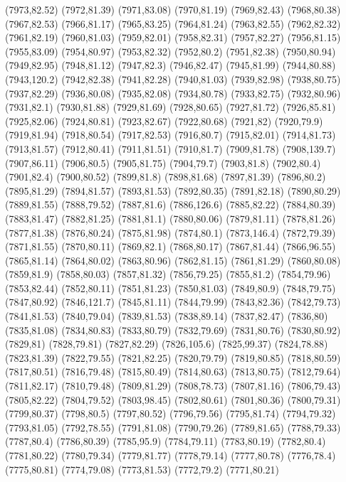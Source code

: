 (7973,82.52)
(7972,81.39)
(7971,83.08)
(7970,81.19)
(7969,82.43)
(7968,80.38)
(7967,82.53)
(7966,81.17)
(7965,83.25)
(7964,81.24)
(7963,82.55)
(7962,82.32)
(7961,82.19)
(7960,81.03)
(7959,82.01)
(7958,82.31)
(7957,82.27)
(7956,81.15)
(7955,83.09)
(7954,80.97)
(7953,82.32)
(7952,80.2)
(7951,82.38)
(7950,80.94)
(7949,82.95)
(7948,81.12)
(7947,82.3)
(7946,82.47)
(7945,81.99)
(7944,80.88)
(7943,120.2)
(7942,82.38)
(7941,82.28)
(7940,81.03)
(7939,82.98)
(7938,80.75)
(7937,82.29)
(7936,80.08)
(7935,82.08)
(7934,80.78)
(7933,82.75)
(7932,80.96)
(7931,82.1)
(7930,81.88)
(7929,81.69)
(7928,80.65)
(7927,81.72)
(7926,85.81)
(7925,82.06)
(7924,80.81)
(7923,82.67)
(7922,80.68)
(7921,82)
(7920,79.9)
(7919,81.94)
(7918,80.54)
(7917,82.53)
(7916,80.7)
(7915,82.01)
(7914,81.73)
(7913,81.57)
(7912,80.41)
(7911,81.51)
(7910,81.7)
(7909,81.78)
(7908,139.7)
(7907,86.11)
(7906,80.5)
(7905,81.75)
(7904,79.7)
(7903,81.8)
(7902,80.4)
(7901,82.4)
(7900,80.52)
(7899,81.8)
(7898,81.68)
(7897,81.39)
(7896,80.2)
(7895,81.29)
(7894,81.57)
(7893,81.53)
(7892,80.35)
(7891,82.18)
(7890,80.29)
(7889,81.55)
(7888,79.52)
(7887,81.6)
(7886,126.6)
(7885,82.22)
(7884,80.39)
(7883,81.47)
(7882,81.25)
(7881,81.1)
(7880,80.06)
(7879,81.11)
(7878,81.26)
(7877,81.38)
(7876,80.24)
(7875,81.98)
(7874,80.1)
(7873,146.4)
(7872,79.39)
(7871,81.55)
(7870,80.11)
(7869,82.1)
(7868,80.17)
(7867,81.44)
(7866,96.55)
(7865,81.14)
(7864,80.02)
(7863,80.96)
(7862,81.15)
(7861,81.29)
(7860,80.08)
(7859,81.9)
(7858,80.03)
(7857,81.32)
(7856,79.25)
(7855,81.2)
(7854,79.96)
(7853,82.44)
(7852,80.11)
(7851,81.23)
(7850,81.03)
(7849,80.9)
(7848,79.75)
(7847,80.92)
(7846,121.7)
(7845,81.11)
(7844,79.99)
(7843,82.36)
(7842,79.73)
(7841,81.53)
(7840,79.04)
(7839,81.53)
(7838,89.14)
(7837,82.47)
(7836,80)
(7835,81.08)
(7834,80.83)
(7833,80.79)
(7832,79.69)
(7831,80.76)
(7830,80.92)
(7829,81)
(7828,79.81)
(7827,82.29)
(7826,105.6)
(7825,99.37)
(7824,78.88)
(7823,81.39)
(7822,79.55)
(7821,82.25)
(7820,79.79)
(7819,80.85)
(7818,80.59)
(7817,80.51)
(7816,79.48)
(7815,80.49)
(7814,80.63)
(7813,80.75)
(7812,79.64)
(7811,82.17)
(7810,79.48)
(7809,81.29)
(7808,78.73)
(7807,81.16)
(7806,79.43)
(7805,82.22)
(7804,79.52)
(7803,98.45)
(7802,80.61)
(7801,80.36)
(7800,79.31)
(7799,80.37)
(7798,80.5)
(7797,80.52)
(7796,79.56)
(7795,81.74)
(7794,79.32)
(7793,81.05)
(7792,78.55)
(7791,81.08)
(7790,79.26)
(7789,81.65)
(7788,79.33)
(7787,80.4)
(7786,80.39)
(7785,95.9)
(7784,79.11)
(7783,80.19)
(7782,80.4)
(7781,80.22)
(7780,79.34)
(7779,81.77)
(7778,79.14)
(7777,80.78)
(7776,78.4)
(7775,80.81)
(7774,79.08)
(7773,81.53)
(7772,79.2)
(7771,80.21)
